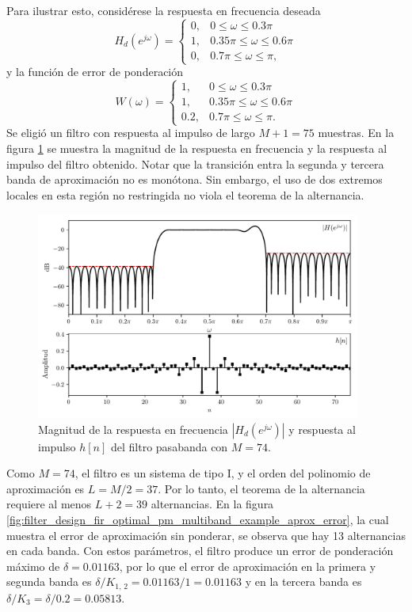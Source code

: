 \documentclass[a4paper]{report}
\begin{document}
Para ilustrar esto, considérese la respuesta en frecuencia deseada
\[
 H_d(e^{j\omega})=
 \left\{ 
 \begin{array}{ll}
  0, & 0\leq\omega\leq0.3\pi\\
  1, & 0.35\pi\leq\omega\leq0.6\pi\\
  0, & 0.7\pi\leq\omega\leq\pi,
 \end{array}
 \right.
\]
y la función de error de ponderación
\[
 W(\omega)=
 \left\{ 
 \begin{array}{ll}
  1, & 0\leq\omega\leq0.3\pi\\
  1, & 0.35\pi\leq\omega\leq0.6\pi\\
  0.2, & 0.7\pi\leq\omega\leq\pi.
 \end{array}
 \right.
\]
Se eligió un filtro con respuesta al impulso de largo \(M+1=75\) muestras. En la figura \ref{fig:filter_design_fir_optimal_pm_multiband_example_absH_h} se muestra la magnitud de la respuesta en frecuencia y la respuesta al impulso del filtro obtenido. Notar que la transición entra la segunda y tercera banda de aproximación no es monótona. Sin embargo, el uso de dos extremos locales en esta región no restringida no viola el teorema de la alternancia.
\begin{figure}[!htb]
 \begin{center}
 \includegraphics[width=0.95\textwidth]{figuras/filter_design_fir_optimal_pm_multiband_example_absH_h.pdf}
 \caption{\label{fig:filter_design_fir_optimal_pm_multiband_example_absH_h} Magnitud de la respuesta en frecuencia \(|H_d(e^{j\omega})|\) y respuesta al impulso \(h[n]\) del filtro pasabanda con \(M=74\).}
 \end{center}
\end{figure}
Como \(M=74\), el filtro es un sistema de tipo I, y el orden del polinomio de aproximación es \(L=M/2=37\). Por lo tanto, el teorema de la alternancia requiere al menos \(L+2=39\) alternancias. En la figura \ref{fig:filter_design_fir_optimal_pm_multiband_example_aprox_error}, la cual muestra el error de aproximación sin ponderar, se observa que hay 13 alternancias en cada banda. Con estos parámetros, el filtro produce un error de ponderación máximo de \(\delta=0.01163\), por lo que el error de aproximación en la primera y segunda banda es \(\delta/K_{1,\,2}=0.01163/1=0.01163\) y en la tercera banda es \(\delta/K_3=\delta/0.2=0.05813\).
\end{document}
